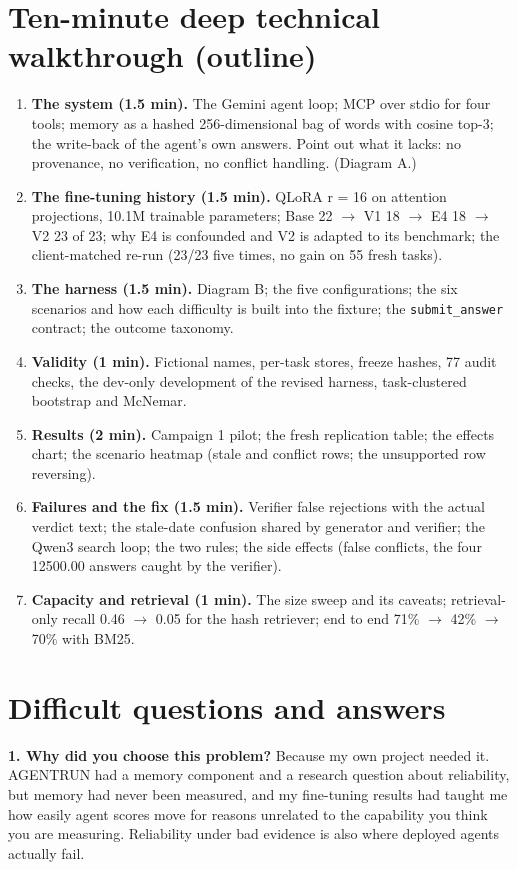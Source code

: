 \documentclass[10.5pt,a4paper,oneside]{report}
\begin{document}
\section{Ten-minute deep technical walkthrough (outline)}
\begin{enumerate}
\item \textbf{The system (1.5 min).} The Gemini agent loop; MCP over stdio for four tools; memory as a hashed 256-dimensional bag of words with cosine top-3; the write-back of the agent's own answers. Point out what it lacks: no provenance, no verification, no conflict handling. (Diagram A.)
\item \textbf{The fine-tuning history (1.5 min).} QLoRA r = 16 on attention projections, 10.1M trainable parameters; Base 22 $\rightarrow$ V1 18 $\rightarrow$ E4 18 $\rightarrow$ V2 23 of 23; why E4 is confounded and V2 is adapted to its benchmark; the client-matched re-run (23/23 five times, no gain on 55 fresh tasks).
\item \textbf{The harness (1.5 min).} Diagram B; the five configurations; the six scenarios and how each difficulty is built into the fixture; the \texttt{submit\_\allowbreak{}answer} contract; the outcome taxonomy.
\item \textbf{Validity (1 min).} Fictional names, per-task stores, freeze hashes, 77 audit checks, the dev-only development of the revised harness, task-clustered bootstrap and McNemar.
\item \textbf{Results (2 min).} Campaign 1 pilot; the fresh replication table; the effects chart; the scenario heatmap (stale and conflict rows; the unsupported row reversing).
\item \textbf{Failures and the fix (1.5 min).} Verifier false rejections with the actual verdict text; the stale-date confusion shared by generator and verifier; the Qwen3 search loop; the two rules; the side effects (false conflicts, the four 12500.00 answers caught by the verifier).
\item \textbf{Capacity and retrieval (1 min).} The size sweep and its caveats; retrieval-only recall 0.46 $\rightarrow$ 0.05 for the hash retriever; end to end 71\% $\rightarrow$ 42\% $\rightarrow$ 70\% with BM25.
\end{enumerate}
\section{Difficult questions and answers}
\textbf{1. Why did you choose this problem?} Because my own project needed it. AGENTRUN had a memory component and a research question about reliability, but memory had never been measured, and my fine-tuning results had taught me how easily agent scores move for reasons unrelated to the capability you think you are measuring. Reliability under bad evidence is also where deployed agents actually fail.
\end{document}
